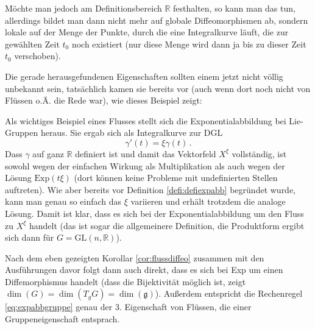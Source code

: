 \documentclass[../H_Analysis_main.tex]{subfiles}
\begin{document}

Möchte man jedoch am Definitionsbereich $\mathbb{R}$ festhalten, so kann man das tun, allerdings bildet man dann nicht mehr auf globale Diffeomorphismen ab, sondern lokale auf der Menge der Punkte, durch die eine Integralkurve läuft, die zur gewählten Zeit $t_0$ noch existiert (nur diese Menge wird dann ja bis zu dieser Zeit $t_0$ verschoben).


Die gerade herausgefundenen Eigenschaften sollten einem jetzt nicht völlig unbekannt sein, tatsächlich kamen sie bereits vor (auch wenn dort noch nicht von Flüssen o.Ä. die Rede war), wie dieses Beispiel zeigt:
\begin{bsp}[Exponentialabbildung]\label{bsp:expabb}
Als wichtiges Beispiel eines Flusses stellt sich die Exponentialabbildung bei Lie-Gruppen heraus. Sie ergab sich als Integralkurve zur DGL
\begin{equation*}
\gamma'(t) = \xi \gamma(t) \, .
\end{equation*}
Dass $\gamma$ auf ganz $\mathbb{R}$ definiert ist und damit das Vektorfeld $X^\xi$ vollständig, ist sowohl wegen der einfachen Wirkung als Multiplikation als auch wegen der Lösung $\text{Exp}(t\xi)$ (dort können keine Probleme mit undefinierten Stellen auftreten). Wie aber bereits vor Definition \ref{defi:defiexpabb} begründet wurde, kann man genau so einfach das $\xi$ variieren und erhält trotzdem die analoge Lösung. Damit ist klar, dass es sich bei der Exponentialabbildung um den Fluss zu $X^\xi$ handelt (das ist sogar die allgemeinere Definition, die Produktform ergibt sich dann für $G = \text{GL}(n, \mathbb{R})$).

Nach dem eben gezeigten Korollar \ref{cor:flussdiffeo} zusammen mit den Ausführungen davor folgt dann auch direkt, dass es sich bei Exp um einen Diffemorphismus handelt (dass die Bijektivität möglich ist, zeigt $\dim(G) = \dim(T_g G) = \dim(\mathfrak{g})$). Außerdem entspricht die Rechenregel \ref{eq:expabbgruppe} genau der 3. Eigenschaft von Flüssen, die einer Gruppeneigenschaft entsprach.
\end{bsp}
\end{document}
